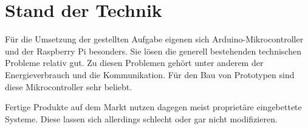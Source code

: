 \section{Stand der Technik}
Für die Umsetzung der gestellten Aufgabe eigenen sich Arduino-Mikrocontroller und der Raspberry Pi besonders. Sie lösen die generell bestehenden technischen Probleme relativ gut. Zu diesen Problemen gehört unter anderem der Energieverbrauch und die Kommunikation. Für den Bau von Prototypen sind diese Mikrocontroller sehr beliebt. 

Fertige Produkte auf dem Markt nutzen dagegen meist proprietäre eingebettete Systeme. Diese lassen sich allerdings schlecht oder gar nicht modifizieren.   

